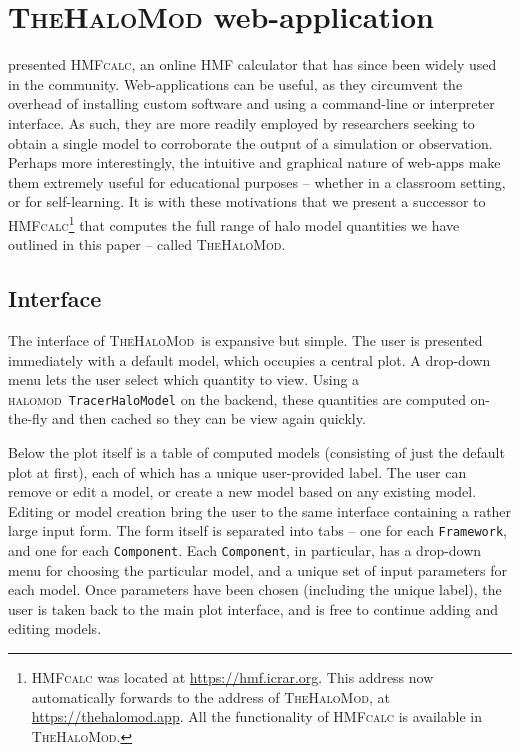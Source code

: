 \documentclass[5p,aas_macros]{elsarticle}
\newcommand{\halomod}{\textsc{halomod}}
\newcommand{\thm}{\textsc{TheHaloMod}}
\newcommand{\framework}{\texttt{Framework}}
\newcommand{\component}{\texttt{Component}}
\begin{document}
\section{\textsc{TheHaloMod} web-application}
\label{sec:thehalomod}
\citet{Murray2013a} presented \textsc{HMFcalc}, an online HMF calculator that has since been widely used in the community.
Web-applications can be useful, as they circumvent the overhead of installing custom software and using a command-line or interpreter interface. 
As such, they are more readily employed by researchers seeking to obtain a single model to corroborate the output of a simulation or observation.
Perhaps more interestingly, the intuitive and graphical nature of web-apps make them extremely useful for educational purposes -- whether in a classroom setting, or for self-learning.
It is with these motivations that we present a successor to \textsc{HMFcalc}\footnote{\textsc{HMFcalc} was located at \url{https://hmf.icrar.org}. This address now automatically forwards to the address of \textsc{TheHaloMod}, at \url{https://thehalomod.app}. All the functionality of \textsc{HMFcalc} is available in \textsc{TheHaloMod}.} that computes the full range of halo model quantities we have outlined in this paper -- called \textsc{TheHaloMod}.


\subsection{Interface}
The interface of \thm\ is expansive but simple. The user is presented immediately with a default model, which occupies a central plot. A drop-down menu lets the user select which quantity to view. Using a \halomod\ \verb|TracerHaloModel| on the backend, these quantities are computed on-the-fly and then cached so they can be view again quickly.

Below the plot itself is a table of computed models (consisting of just the default plot at first), each of which has a unique user-provided label. 
The user can remove or edit a model, or create a new model based on any existing model. Editing or model creation bring the user to the same interface containing a rather large input form. 
The form itself is separated into tabs -- one for each \framework, and one for each \component. 
Each \component, in particular, has a drop-down menu for choosing the particular model, and a unique set of input parameters for each model.
Once parameters have been chosen (including the unique label), the user is taken back to the main plot interface, and is free to continue adding and editing models.
\end{document}
